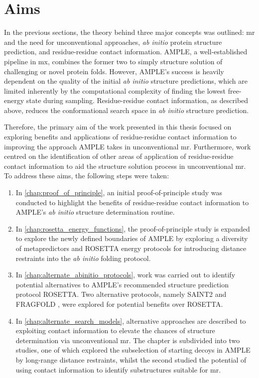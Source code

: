 %
%

\section{Aims}
In the previous sections, the theory behind three major concepts was outlined: \acrlong{mr} and the need for unconventional approaches, \textit{ab initio} protein structure prediction, and residue-residue contact information. AMPLE, a well-established pipeline in \gls{mx}, combines the former two to simply structure solution of challenging or novel protein folds. However, AMPLE's success is heavily dependent on the quality of the initial \textit{ab initio} structure predictions, which are limited inherently by the computational complexity of finding the lowest free-energy state during sampling. Residue-residue contact information, as described above, reduces the conformational search space in \textit{ab initio} structure prediction.

Therefore, the primary aim of the work presented in this thesis focused on exploring benefits and applications of residue-residue contact information to improving the approach AMPLE takes in unconventional \gls{mr}. Furthermore, work centred on the identification of other areas of application of residue-residue contact information to aid the structure solution process in unconventional \gls{mr}. To address these aims, the following steps were taken:

\begin{enumerate}
    \item In \cref{chap:proof_of_principle}, an initial proof-of-principle study was conducted to highlight the benefits of residue-residue contact information to AMPLE's \textit{ab initio} structure determination routine.
    \item In \cref{chap:rosetta_energy_functions}, the proof-of-principle study is expanded to explore the newly defined boundaries of AMPLE by exploring a diversity of metapredictors and ROSETTA energy protocols for introducing distance restraints into the \textit{ab initio} folding protocol.
    \item In \cref{chap:alternate_abinitio_protocols}, work was carried out to identify potential alternatives to AMPLE's recommended structure prediction protocol ROSETTA. Two alternative protocols, namely SAINT2 \cite{De_Oliveira2017-sg} and FRAGFOLD \cite{Kosciolek2014-bt}, were explored for potential benefits over ROSETTA.
    \item In \cref{chap:alternate_search_models}, alternative approaches are described to exploiting contact information to elevate the chances of structure determination via unconventional \gls{mr}. The chapter is subdivided into two studies, one of which explored the subselection of starting decoys in AMPLE by long-range distance restraints, whilst the second studied the potential of using contact information to identify substructures suitable for \gls{mr}.
\end{enumerate}
